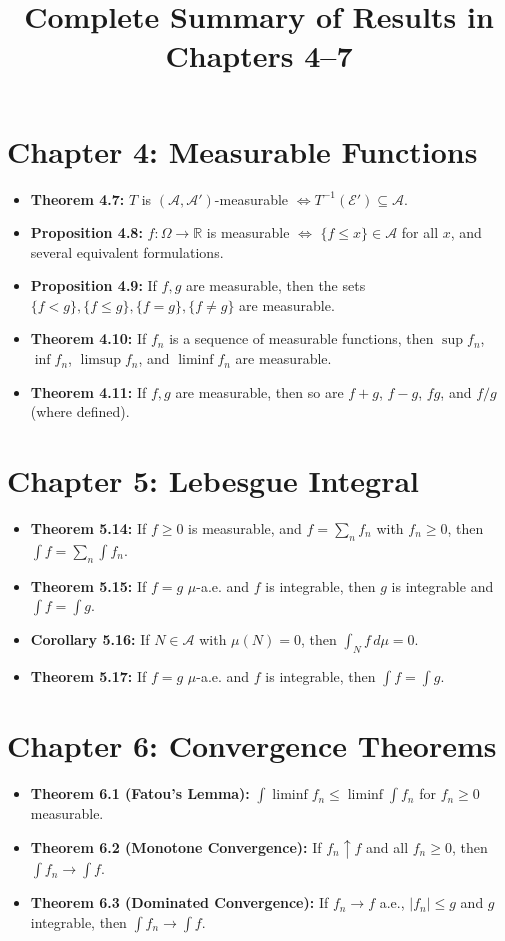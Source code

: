 \documentclass{article}
\title{Complete Summary of Results in Chapters 4--7}
\author{}
\date{}
\begin{document}
\maketitle

\section*{Chapter 4: Measurable Functions}
\begin{itemize}
  \item \textbf{Theorem 4.7:} $T$ is $(\mathcal{A}, \mathcal{A}')$-measurable $\iff T^{-1}(\mathcal{E}') \subseteq \mathcal{A}$.
  \item \textbf{Proposition 4.8:} $f: \Omega \to \mathbb{R}$ is measurable $\iff$ $\{f \le x\} \in \mathcal{A}$ for all $x$, and several equivalent formulations.
  \item \textbf{Proposition 4.9:} If $f, g$ are measurable, then the sets $\{f < g\}, \{f \le g\}, \{f = g\}, \{f \ne g\}$ are measurable.
  \item \textbf{Theorem 4.10:} If $f_n$ is a sequence of measurable functions, then $\sup f_n$, $\inf f_n$, $\limsup f_n$, and $\liminf f_n$ are measurable.
  \item \textbf{Theorem 4.11:} If $f, g$ are measurable, then so are $f+g$, $f-g$, $fg$, and $f/g$ (where defined).
\end{itemize}

\section*{Chapter 5: Lebesgue Integral}
\begin{itemize}
  \item \textbf{Theorem 5.14:} If $f \ge 0$ is measurable, and $f = \sum_n f_n$ with $f_n \ge 0$, then $\int f = \sum_n \int f_n$.
  \item \textbf{Theorem 5.15:} If $f = g$ $\mu$-a.e. and $f$ is integrable, then $g$ is integrable and $\int f = \int g$.
  \item \textbf{Corollary 5.16:} If $N \in \mathcal{A}$ with $\mu(N) = 0$, then $\int_N f \, d\mu = 0$.
  \item \textbf{Theorem 5.17:} If $f = g$ $\mu$-a.e. and $f$ is integrable, then $\int f = \int g$.
\end{itemize}

\section*{Chapter 6: Convergence Theorems}
\begin{itemize}
  \item \textbf{Theorem 6.1 (Fatou’s Lemma):} $\int \liminf f_n \le \liminf \int f_n$ for $f_n \ge 0$ measurable.
  \item \textbf{Theorem 6.2 (Monotone Convergence):} If $f_n \uparrow f$ and all $f_n \ge 0$, then $\int f_n \to \int f$.
  \item \textbf{Theorem 6.3 (Dominated Convergence):} If $f_n \to f$ a.e., $|f_n| \le g$ and $g$ integrable, then $\int f_n \to \int f$.
\end{itemize}
\end{document}
